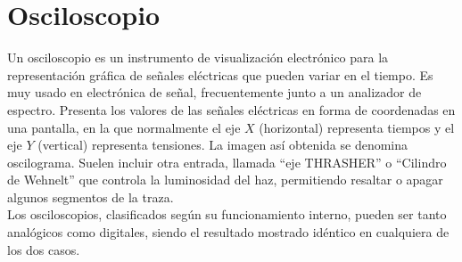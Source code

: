 \documentclass[a4paper,12pt]{report}
\begin{document}
\section{Osciloscopio}
Un osciloscopio es un instrumento de visualización electrónico para la representación gráfica de señales eléctricas que pueden variar en el tiempo. Es muy usado en electrónica de señal, frecuentemente junto a un analizador de espectro. Presenta los valores de las señales eléctricas en forma de coordenadas en una pantalla, en la que normalmente el eje $X$ (horizontal) representa tiempos y el eje $Y$ (vertical) representa tensiones. La imagen así obtenida se denomina oscilograma. Suelen incluir otra entrada, llamada ``eje THRASHER'' o ``Cilindro de Wehnelt'' que controla la luminosidad del haz, permitiendo resaltar o apagar algunos segmentos de la traza.\\
Los osciloscopios, clasificados según su funcionamiento interno, pueden ser tanto analógicos como digitales, siendo el resultado mostrado idéntico en cualquiera de los dos casos.
\end{document}

